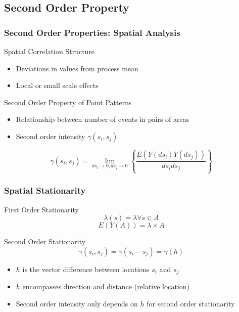 \documentclass[nototal,handout]{beamer}
\begin{document}
\subsection{Second Order Property}
\begin{frame}[<+->]
  \frametitle{Second Order Properties: Spatial Analysis}
  \begin{block}{Spatial Correlation Structure}
    \begin{itemize}
      \item Deviations in values from process mean
      \item Local or small scale effects
    \end{itemize}
   \end{block}
   \begin{block}{Second Order Property of Point Patterns}
     \begin{itemize}
      \item Relationship between number of events in pairs of areas
       \item Second order intensity $\gamma(s_i,s_j)$
     \end{itemize}
   \end{block}

\begin{block}{}
     \begin{equation}
       \gamma(s_i,s_j) = \lim_{ds_i\rightarrow 0,ds_j\rightarrow 0}\left\{
       \frac{E(Y(ds_i)Y(ds_j))}{ds_ids_j} \right\}
     \end{equation}
    \end{block}

 \end{frame}

 \begin{frame}[<+->]
   \frametitle{Spatial Stationarity}
   \begin{block}{First Order Stationarity}
     \begin{equation}
       \lambda(s) = \lambda \forall s \in A
     \end{equation}
	\begin{equation}
	  E(Y(A)) = \lambda \times A
     \end{equation}
    \end{block}

    \begin{block}{Second Order Stationarity}
      \begin{equation}
	\gamma(s_i,s_j) = \gamma(s_i - s_j) = \gamma(h)
      \end{equation}
      \begin{itemize}
	\item $h$ is the vector difference between locations $s_i$ and $s_j$
	\item $h$ encompasses direction and distance (relative location)
	\item Second order intensity only depends on $h$ for second order stationarity
      \end{itemize}
    \end{block}
  \end{frame}
\end{document}
